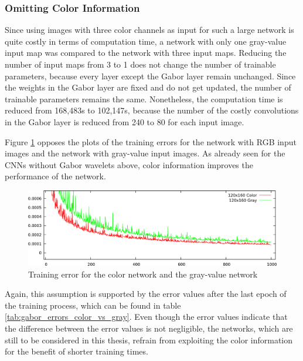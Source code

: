 \documentclass[11pt, a4paper]{article}
\begin{document}
\subsubsection{Omitting Color Information}

Since using images with three color channels as input for such a large network is quite costly in terms of computation time, a network with only one gray-value input map was compared to the network with three input maps. Reducing the number of input maps from 3 to 1 does not change the number of trainable parameters, because every layer except the Gabor layer remain unchanged. Since the weights in the Gabor layer are fixed and do not get updated, the number of trainable parameters remains the same. Nonetheless, the computation time is reduced from 168,483s to 102,147s, because the number of the costly convolutions in the Gabor layer is reduced from 240 to 80 for each input image.

Figure \ref{fig:gabor_absatan2_color_vs_gray} opposes the plots of the training errors for the network with \ac{RGB} input images and the network with gray-value input images. As already seen for the \acp{CNN} without Gabor wavelets above, color information improves the performance of the network.

\begin{figure}[h!]
	\centering
	\includegraphics[width=\textwidth]{images/results/gabor_absatan2_color_vs_gray.png}
	\caption{Training error for the color network and the gray-value network}
	\label{fig:gabor_absatan2_color_vs_gray}
\end{figure}

Again, this assumption is supported by the error values after the last epoch of the training process, which can be found in table \ref{tab:gabor_errors_color_vs_gray}. Even though the error values indicate that the difference between the error values is not negligible, the networks, which are still to be considered in this thesis, refrain from exploiting the color information for the benefit of shorter training times.


\end{document}
